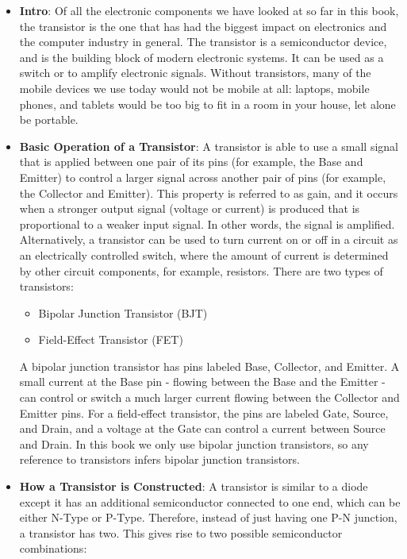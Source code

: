 \documentclass{report}
\begin{document}
    \pagebreak 
    \begin{itemize}
        \item \textbf{Intro}: Of all the electronic components we have looked at so far in this book, the transistor is the one that has had the biggest impact on electronics and the computer industry in general. The transistor is a semiconductor device, and is the building block of modern electronic systems. It can be used as a switch or to amplify electronic signals.
            \bigbreak \noindent 
            Without transistors, many of the mobile devices we use today would not be mobile at all: laptops, mobile phones, and tablets would be too big to fit in a room in your house, let alone be portable.
        \item \textbf{Basic Operation of a Transistor}: A transistor is able to use a small signal that is applied between one pair of its pins (for example, the Base and Emitter) to control a larger signal across another pair of pins (for example, the Collector and Emitter). This property is referred to as gain, and it occurs when a stronger output signal (voltage or current) is produced that is proportional to a weaker input signal. In other words, the signal is amplified. Alternatively, a transistor can be used to turn current on or off in a circuit as an electrically controlled switch, where the amount of current is determined by other circuit components, for example, resistors.
            \bigbreak \noindent 
            There are two types of transistors:
            \begin{itemize}
                \item Bipolar Junction Transistor (BJT)
                \item Field-Effect Transistor (FET)
            \end{itemize}
            A bipolar junction transistor has pins labeled Base, Collector, and Emitter. A small current at the Base pin - flowing between the Base and the Emitter - can control or switch a much larger current flowing between the Collector and Emitter pins. 
            \bigbreak \noindent 
            For a field-effect transistor, the pins are labeled Gate, Source, and Drain, and a voltage at the Gate can control a current between Source and Drain. In this book we only use bipolar junction transistors, so any reference to transistors infers bipolar junction transistors.
        \item \textbf{How a Transistor is Constructed}: A transistor is similar to a diode except it has an additional semiconductor connected to one end, which can be either N-Type or P-Type. Therefore, instead of just having one P-N junction, a transistor has two. This gives rise to two possible semiconductor combinations:

\end{itemize}
\end{document}
